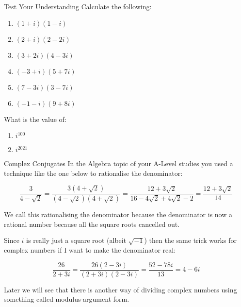 \documentclass[8pt]{beamer}
\begin{document}
	\begin{frame}{Test Your Understanding}
	    Calculate the following:
	    \begin{enumerate}[label={(\alph*)}]
	        \item $(1+i)(1-i)$ 
	        \item $(2+i)(2-2i)$ 
	        \item $(3+2i)(4-3i)$ 
	        \item $(-3+i)(5+7i)$ 
	        \item $(7-3i)(3-7i)$ 
	        \item $(-1-i)(9+8i)$ 
	    \end{enumerate}
	    
	    What is the value of:
	    \begin{enumerate}[label={(\alph*)}]
	        \item $i^{100}$ 
	        \item $i^{2021}$ 
	   \end{enumerate}
	\end{frame}

	\begin{frame}{Complex Conjugates}
	    In the Algebra topic of your A-Level studies you used a technique like the one below to rationalise the denominator:
	    
        \begin{equation*}
            \frac{3}{4-\sqrt{2}} = \frac{3(4+\sqrt{2})}{(4-\sqrt{2})(4+\sqrt{2})} = \frac{12+3\sqrt{2}}{16-4\sqrt{2}+4\sqrt{2}-2} = \frac{12+3\sqrt{2}}{14}
        \end{equation*}
        
        \vspace{\baselineskip}
        
        We call this rationalising the denominator because the denominator is now a rational number because all the square roots cancelled out.
        
        Since $i$ is really just a square root (albeit $\sqrt{-1}$) then the same trick works for complex numbers if I want to make the denominator real:
        
        \begin{equation*}
            \frac{26}{2+3i} = \frac{26(2-3i)}{(2+3i)(2-3i)} = \frac{52-78i}{13} = 4-6i
        \end{equation*}
        
        \vspace{\baselineskip}
        
        \alert<1>{Later we will see that there is another way of dividing complex numbers using something called modulus-argument form.}
	\end{frame}
	
\end{document}
